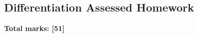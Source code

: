 \documentclass[../c1]{subfiles}
\begin{document}
\subsection*{Differentiation Assessed Homework}
\thispagestyle{fancy}



\begin{flushright}
\textbf{Total marks: [51]}
\end{flushright}
\end{document}
